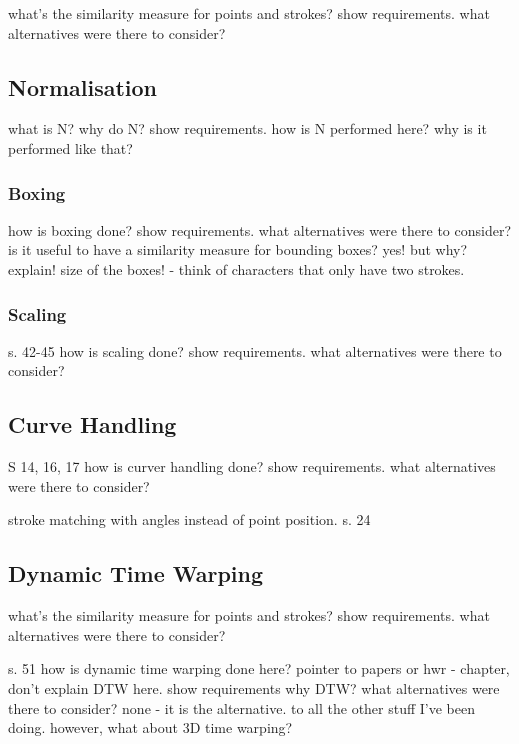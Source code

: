what's the similarity measure for
points and strokes?
show requirements.
what alternatives were there to consider?

\subsection{Normalisation}
\label{sec:hwre:normalisation}

what is N?
why do N?
show requirements.
how is N performed here?
why is it performed like that?

\subsubsection{Boxing}
\label{sec:hwre:boxing}
how is boxing done?
show requirements.
what alternatives were there to consider?
is it useful to have a similarity measure for bounding boxes?
yes! but why? explain!
size of the boxes! - think of characters that only have two strokes.

\subsubsection{Scaling}
\label{sec:hwre:scaling}


s. 42-45
how is scaling done?
show requirements.
what alternatives were there to consider?

\subsection{Curve Handling}
\label{sec:hwre:curvehandling}



S 14, 16, 17
how is curver handling done?
show requirements.
what alternatives were there to consider?

stroke matching with angles instead of point position.
s. 24

\subsection{Dynamic Time Warping}
\label{sec:hwre:dynamictimewarping}



what's the similarity measure for
points and strokes?
show requirements.
what alternatives were there to consider?

s. 51
how is dynamic time warping done here?
pointer to papers or hwr - chapter, don't explain DTW here.
show requirements
why DTW?
what alternatives were there to consider?
none - it is the alternative.
to all the other stuff I've been doing.
however, what about 3D time warping?



